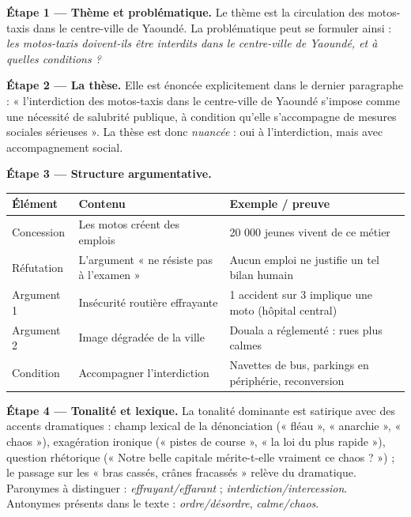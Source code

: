 \documentclass[11pt]{article}
\newcommand{\cle}[1]{{\popxbold\color{popdark}#1}}
\begin{document}
\begin{exoresolu}
\textbf{Étape 1 — Thème et problématique.} Le thème est la circulation des motos-taxis dans le centre-ville de Yaoundé. La problématique peut se formuler ainsi : \emph{les motos-taxis doivent-ils être interdits dans le centre-ville de Yaoundé, et à quelles conditions ?}

\tcblower

\textbf{Étape 2 — La thèse.} Elle est énoncée explicitement dans le dernier paragraphe : « l'interdiction des motos-taxis dans le centre-ville de Yaoundé s'impose comme une nécessité de salubrité publique, à condition qu'elle s'accompagne de mesures sociales sérieuses ». La thèse est donc \emph{nuancée} : oui à l'interdiction, mais avec accompagnement social.

\textbf{Étape 3 — Structure argumentative.}

\begin{center}
\begin{tabularx}{\linewidth}{|l|X|X|}\hline
\rowcolor{popblueL} \textbf{Élément} & \textbf{Contenu} & \textbf{Exemple / preuve} \\ \hline
Concession & Les motos créent des emplois & 20 000 jeunes vivent de ce métier \\ \hline
Réfutation & L'argument « ne résiste pas à l'examen » & Aucun emploi ne justifie un tel bilan humain \\ \hline
Argument 1 & Insécurité routière effrayante & 1 accident sur 3 implique une moto (hôpital central) \\ \hline
Argument 2 & Image dégradée de la ville & Douala a réglementé : rues plus calmes \\ \hline
Condition & Accompagner l'interdiction & Navettes de bus, parkings en périphérie, reconversion \\ \hline
\end{tabularx}
\end{center}

\textbf{Étape 4 — Tonalité et lexique.} La tonalité dominante est \cle{satirique} avec des accents dramatiques : champ lexical de la dénonciation (« fléau », « anarchie », « chaos »), exagération ironique (« pistes de course », « la loi du plus rapide »), question rhétorique (« Notre belle capitale mérite-t-elle vraiment ce chaos ? ») ; le passage sur les « bras cassés, crânes fracassés » relève du dramatique. Paronymes à distinguer : \emph{effrayant/effarant} ; \emph{interdiction/intercession}. Antonymes présents dans le texte : \emph{ordre/désordre}, \emph{calme/chaos}.


\end{exoresolu}
\end{document}
